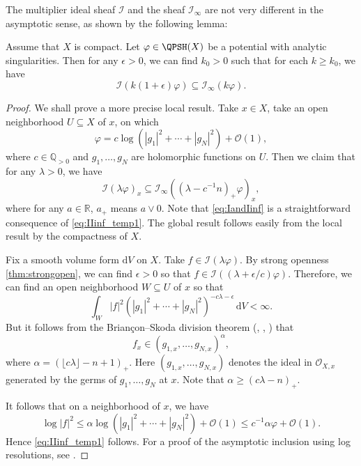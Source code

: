 The multiplier ideal sheaf $\mathcal{I}$ and the sheaf $\mathcal{I}_{\infty}$ are not very different in the asymptotic sense, as shown by the following lemma:
\begin{lemma}\label{lma:IandIinf}
    Assume that $X$ is compact. Let $\varphi\in \QPSH(X)$ be a potential with analytic singularities. Then for any $\epsilon>0$, we can find $k_0>0$ such that for each $k\geq k_0$, we have
    \begin{equation}\label{eq:IandIinf}
        \mathcal{I}\left(k(1+\epsilon)\varphi\right)\subseteq \mathcal{I}_{\infty}(k\varphi).
    \end{equation}
\end{lemma}
\begin{proof}
    We shall prove a more precise local result. Take $x\in X$, take an open neighborhood $U\subseteq X$ of $x$, on which
    \[
    \varphi=c\log \left( |g_1|^2 +\cdots+|g_N|^2\right)+\mathcal{O}(1),
    \]
    where $c\in \mathbb{Q}_{>0}$ and $g_1,\ldots,g_N$ are holomorphic functions on $U$. Then we claim that for any $\lambda>0$, we have
    \begin{equation}\label{eq:IIinf_temp1}
        \mathcal{I}(\lambda\varphi)_x\subseteq \mathcal{I}_{\infty}\left( \left( \lambda-c^{-1}n \right)_+\varphi \right)_x,
    \end{equation}
    where for any $a\in \mathbb{R}$, $a_+$ means $a\lor 0$. Note that \eqref{eq:IandIinf} is a straightforward consequence of \eqref{eq:IIinf_temp1}. The global result follows easily from the local result by the compactness of $X$.

    Fix a smooth volume form $\mathrm{d}V$ on $X$.
    Take $f\in \mathcal{I}(\lambda\varphi)$. By strong openness \cref{thm:strongopen}, we can find $\epsilon>0$ so that $f\in \mathcal{I}((\lambda+\epsilon/c)\varphi)$. Therefore, we can find an open neighborhood $W\subseteq U$ of $x$ so that
    \[
    \int_W |f|^2\left( |g_1|^2 +\cdots+|g_N|^2\right)^{-c\lambda-\epsilon}\,\mathrm{d}V<\infty.
    \]
    But it follows from the Briançon--Skoda division theorem (\cite{Sko72}, \cite{SB74}, \cite[Theorem~11.17]{Dem12}) that
    \[
    f_x\in \left(g_{1,x},\ldots,g_{N,x} \right)^\alpha,
    \]
    where $\alpha=\left(\lfloor c \lambda \rfloor-n+1\right)_+$. Here $\left(g_{1,x},\ldots,g_{N,x} \right)$ denotes the ideal in $\mathcal{O}_{X,x}$ generated by the germs of $g_1,\ldots,g_N$ at $x$. Note that $\alpha\geq (c\lambda-n)_+$.

    It follows that on a neighborhood of $x$, we have
    \[
    \log |f|^2\leq \alpha \log \left( |g_1|^2 +\cdots+|g_N|^2\right)+\mathcal{O}(1)\leq c^{-1}\alpha \varphi+\mathcal{O}(1).
    \]
    Hence \eqref{eq:IIinf_temp1} follows. For a proof of the asymptotic inclusion using log resolutions, see \cite[Corollary~13.6.3]{FPT}.
\end{proof}

